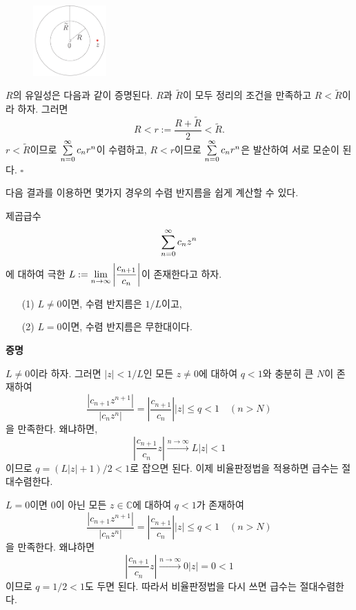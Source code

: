 \begin{figure}[h!]
\begin{center}
\includegraphics[width=0.25\textwidth]{./SaltChapter/figs/fig-4-0-2}
\end{center}
\end{figure}

$R$의 유일성은 다음과 같이 증명된다.
$R$과 $\tilde R$이 모두 정리의 조건을 만족하고 $R<\tilde R$이라 하자.
그러면
\[
R < r:= \dfrac{R+\tilde R}{2} < \tilde R.
\]
$r<\tilde R$이므로
$\sum\limits_{n=0}^\infty c_n r^n$이 수렴하고,
$R<r$이므로 $\sum\limits_{n=0}^\infty c_n r^n$은 발산하여
서로 모순이 된다.
\hfill $\square$

다음 결과를 이용하면
몇가지 경우의 수렴 반지름을 쉽게 계산할 수 있다.

 \begin{salttheorem} {}{} \label{thm-4-2}
제곱급수 
\[
\sum\limits_{n=0}^\infty c_nz^n
\]에 대하여 극한
$L:= \lim\limits_{n\to\infty} \left| \displaystyle\frac{c_{n+1}}{c_n}\right|$이
존재한다고 하자. 
\begin{itemize}
\item[(1)] $L\ne0$이면, 수렴 반지름은 $1/L$이고,
\item[(2)] $L=0$이면, 수렴 반지름은 무한대이다.
\end{itemize}
\end{salttheorem}

{\bf 증명}

$L\ne0$이라 하자.
그러면 $|z|<1/L$인 모든 $z\ne0$에 대하여
$q<1$와 충분히 큰 $N$이 존재하여
\[
\dfrac{|c_{n+1}z^{n+1}|}{|c_nz^n|}
= \left| \dfrac{c_{n+1}}{c_n}\right| |z| \le q <1
\quad (n>N)
\]
을 만족한다.
왜냐하면,
\[
\left|\dfrac{c_{n+1}}{c_n}z\right|
\xrightarrow{n\to\infty}
L|z|<1
\]
이므로 $q=(L|z|+1)/2 <1$로 잡으면 된다.
이제 비율판정법을 적용하면 급수는 절대수렴한다.

$L=0$이면 $0$이 아닌 모든 $z\in \mathbb C$에 대하여
$q<1$가 존재하여
\[
\dfrac{|c_{n+1}z^{n+1}|}{|c_nz^n|}
= \left| \dfrac{c_{n+1}}{c_n}\right| |z| \le q <1
\quad (n>N)
\]
을 만족한다. 왜냐하면
\[
\left|\dfrac{c_{n+1}}{c_n}z\right|
\xrightarrow{n\to\infty}
0|z|=0<1
\]
이므로 $q=1/2<1$도 두면 된다.
따라서 비율판정법을 다시 쓰면 급수는 절대수렴한다.


